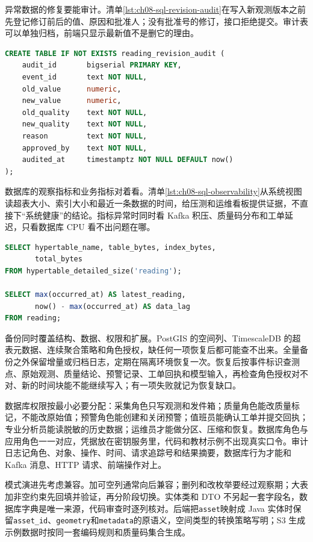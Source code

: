 异常数据的修复要能审计。清单\ref{lst:ch08-sql-revision-audit}在写入新观测版本之前先登记修订前后的值、原因和批准人；没有批准号的修订，接口拒绝提交。审计表可以单独归档，前端只显示最新值不是删它的理由。

\begin{lstlisting}[label={lst:ch08-sql-revision-audit},language=SQL,caption={观测修订审计登记}]
CREATE TABLE IF NOT EXISTS reading_revision_audit (
    audit_id       bigserial PRIMARY KEY,
    event_id       text NOT NULL,
    old_value      numeric,
    new_value      numeric,
    old_quality    text NOT NULL,
    new_quality    text NOT NULL,
    reason         text NOT NULL,
    approved_by    text NOT NULL,
    audited_at     timestamptz NOT NULL DEFAULT now()
);
\end{lstlisting}

数据库的观察指标和业务指标对着看。清单\ref{lst:ch08-sql-observability}从系统视图读超表大小、索引大小和最近一条数据的时间，给压测和运维看板提供证据，不直接下“系统健康”的结论。指标异常时同时看 Kafka 积压、质量码分布和工单延迟，只看数据库 CPU 看不出问题在哪。

\begin{lstlisting}[label={lst:ch08-sql-observability},language=SQL,caption={数据库容量与新鲜度观察}]
SELECT hypertable_name, table_bytes, index_bytes,
       total_bytes
FROM hypertable_detailed_size('reading');

SELECT max(occurred_at) AS latest_reading,
       now() - max(occurred_at) AS data_lag
FROM reading;
\end{lstlisting}

备份同时覆盖结构、数据、权限和扩展。PostGIS 的空间列、TimescaleDB 的超表元数据、连续聚合策略和角色授权，缺任何一项恢复后都可能查不出来。全量备份之外保留增量或归档日志，定期在隔离环境恢复一次。恢复后按事件标识查测点、原始观测、质量结论、预警记录、工单回执和模型输入，再检查角色授权对不对、新的时间块能不能继续写入；有一项失败就记为恢复缺口。

数据库权限按最小必要分配：采集角色只写观测和发件箱；质量角色能改质量标记，不能改原始值；预警角色能创建和关闭预警；值班员能确认工单并提交回执；专业分析员能读脱敏的历史数据；运维员才能做分区、压缩和恢复。数据库角色与应用角色一一对应，凭据放在密钥服务里，代码和教材示例不出现真实口令。审计日志记角色、对象、操作、时间、请求追踪号和结果摘要，数据库行为才能和 Kafka 消息、HTTP 请求、前端操作对上。

模式演进先考虑兼容。加可空列通常向后兼容；删列和改枚举要经过观察期；大表加非空约束先回填并验证，再分阶段切换。实体类和 DTO 不另起一套字段名，数据库字典是唯一来源，代码审查时逐列核对。后端把\texttt{asset}映射成 Java 实体时保留\texttt{asset\_id}、\texttt{geometry}和\texttt{metadata}的原语义，空间类型的转换策略写明；S3 生成示例数据时按同一套编码规则和质量码集合生成。

